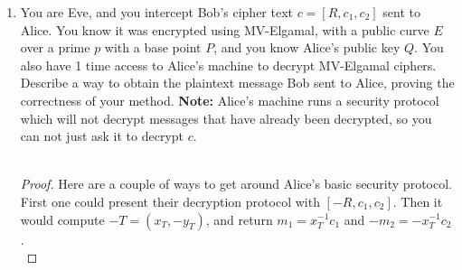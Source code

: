 \documentclass[11pt]{article}
\newcommand{\bF}{\mathbb{F}}
\begin{document}
\begin{enumerate}
{\begin{enumerate}
\begin{proof}
      \textbf{Option 2:} Suppose $f$ behaves sufficiently randomly, so that $f(z)$ is random if $z$ is.  Then the probability that a random $z$ is a valid $x$-coordinate is the same as the probability that a random element of $\bF_p$ is perfect square$-$or a quadratic residue if we'd like to eliminate cases where the $y$-coordinate is 0.  By Homework 2 Problem 8(d) there are $(p-1)/2$ perfect square in $\bF_p^*$, so that the number of valid $x$-coordinates is approximately $\frac{p-1}{2}$ (or respectively $\frac{p+1}{2}$).  For large $p$ this is approximately $p/2$.  Therefore $\rho\approx1/2$ and $E(X)\approx 2$.
    \end{proof}
    \item{
    Explicitly describe the steps you need to add to the algorithm from Problem 7 in order to be able to communicate in plain language.  (Including applying things like \verb|intToText|).
    }
    \begin{proof}
      Call the algorithm described in part (b) \verb|mapToPoint(m)|.
      \begin{enumerate}[(1)]
        \item{
        Alice takes her \verb|message| and computes \verb|m = textToInt(message)|.  She chooses a prime $p$ with over twice as many bits as $m$ and an elliptic curve $E/\bF_p$, publishing both.
        }
        \item{
        Alice compute \verb|P = mapToPoint(m)|.  It terminates in approximately 2 steps.
        }
        \item{
        Alice initiates the message exchange described in problem 7.
        }
        \item{
        It teminates, and Bob has $P = (x,y)\in E(\bF_p)$.  Bob recoveres $m$ as the last $k$ bits of $x$.
        }
        \item{
        Bob recovers \verb|message = intToText(m)|.
        }
      \end{enumerate}
    \end{proof}
  \end{enumerate}
  }
  \item{
  You are Eve, and you intercept Bob's cipher text $c = [R,c_1,c_2]$ sent to Alice.  You know it was encrypted using MV-Elgamal, with a public curve $E$ over a prime $p$ with a base point $P$, and you know Alice's public key $Q$.  You also have 1 time access to Alice's machine to decrypt MV-Elgamal ciphers.  Describe a way to obtain the plaintext message Bob sent to Alice, proving the correctness of your method.  \textbf{Note:} Alice's machine runs a security protocol which will not decrypt messages that have already been decrypted, so you can not just ask it to decrypt $c$.\\
  \\
  \begin{proof}
    Here are a couple of ways to get around Alice's basic security protocol.  First one could present their decryption protocol with $[-R,c_1,c_2]$.  Then it would compute $-T = (x_T,-y_T)$, and return $m_1 = x_T^{-1}c_1$ and $-m_2 = -x_T^{-1}c_2$.\\


\end{proof}}
\end{enumerate}
\end{document}
